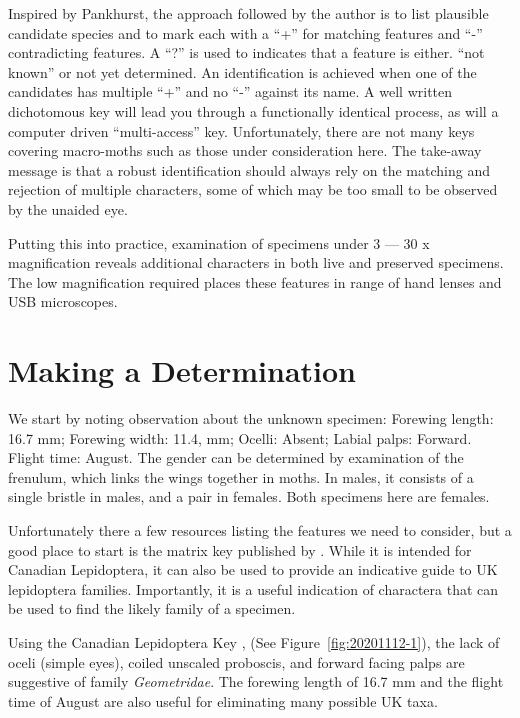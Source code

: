 \documentclass[]{article}
\begin{document}
 Inspired by Pankhurst, the approach followed by the author is to list plausible candidate species and to mark each with a \enquote{+} for matching features and \enquote{-} contradicting features. A \enquote{?} is used to  indicates that a feature is either. \enquote{not known} or not yet determined. An identification is achieved when one of the candidates has multiple \enquote{+} and no \enquote{-} against its name.
 A well written dichotomous key will lead you through a functionally identical process, as will a computer driven \enquote{multi-access} key. Unfortunately, there are not many keys covering macro-moths such as those under consideration here.
 The take-away message is that a robust identification should always rely on the matching and rejection of multiple characters, some of which may be too small to be observed by the unaided eye.  
 
 Putting this into practice,  examination of specimens under  3 --- 30 x magnification reveals additional characters  in both live and preserved specimens. The low magnification required places these features in range of hand lenses and USB microscopes. 

\section*{Making a Determination}
We start by noting observation about the unknown specimen:
Forewing length: 16.7 mm; Forewing width: 11.4, mm;  Ocelli: Absent;  Labial palps: Forward. Flight time: August. The gender can be determined by examination of the frenulum, which links the wings together in moths. In males, it consists of a single bristle in males, and a pair in females. Both specimens here are females.

Unfortunately there a few resources listing the features we need to consider, but a good place to start is the matrix key published by \citet{Dombroskie2011}. While it is intended for Canadian Lepidoptera, it can also be used to provide an indicative guide to UK lepidoptera families. Importantly, it is a useful indication of charactera that can be used to find the likely family of a specimen.

Using the Canadian Lepidoptera Key , (See Figure~\ref{fig:20201112-1}), the lack of oceli (simple eyes), coiled unscaled proboscis, and forward facing palps are suggestive of family \textit{Geometridae}. The forewing length of 16.7 mm and the flight time of August are also useful for eliminating many possible UK taxa.
\end{document}
